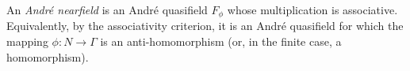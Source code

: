 An \emph{André nearfield} is an André quasifield $F_\phi$ whose multiplication is associative. Equivalently, by the associativity criterion, it is an André quasifield for which the mapping $\phi: N \to \Gamma$ is an anti-homomorphism (or, in the finite case, a homomorphism).